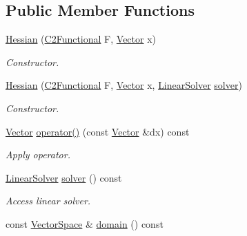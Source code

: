 \subsection*{Public Member Functions}
\begin{DoxyCompactItemize}
\item 
\hyperlink{classSpacy_1_1Hessian_a0d68a39d36030fb578c6082e66cd1733_a0d68a39d36030fb578c6082e66cd1733}{Hessian} (\hyperlink{group__SpacyGroup_gaf5b89e117806134b06a1ce4629fb2b65_gaf5b89e117806134b06a1ce4629fb2b65}{C2\+Functional} F, \hyperlink{classSpacy_1_1Vector}{Vector} x)
\begin{DoxyCompactList}\small\item\em Constructor. \end{DoxyCompactList}\item 
\hyperlink{classSpacy_1_1Hessian_a164c5994d90dbc86018e5763b20d406e_a164c5994d90dbc86018e5763b20d406e}{Hessian} (\hyperlink{group__SpacyGroup_gaf5b89e117806134b06a1ce4629fb2b65_gaf5b89e117806134b06a1ce4629fb2b65}{C2\+Functional} F, \hyperlink{classSpacy_1_1Vector}{Vector} x, \hyperlink{namespaceSpacy_a7d5cd1c6fb9dd85aa345b536caf30bba_a7d5cd1c6fb9dd85aa345b536caf30bba}{Linear\+Solver} \hyperlink{classSpacy_1_1Hessian_ab198b43edafe331ba98299e136dc6daa_ab198b43edafe331ba98299e136dc6daa}{solver})
\begin{DoxyCompactList}\small\item\em Constructor. \end{DoxyCompactList}\item 
\hyperlink{classSpacy_1_1Vector}{Vector} \hyperlink{classSpacy_1_1Hessian_a9ceba3446ef241ce4f557add097b8f9c_a9ceba3446ef241ce4f557add097b8f9c}{operator()} (const \hyperlink{classSpacy_1_1Vector}{Vector} \&dx) const 
\begin{DoxyCompactList}\small\item\em Apply operator. \end{DoxyCompactList}\item 
\hyperlink{namespaceSpacy_a7d5cd1c6fb9dd85aa345b536caf30bba_a7d5cd1c6fb9dd85aa345b536caf30bba}{Linear\+Solver} \hyperlink{classSpacy_1_1Hessian_ab198b43edafe331ba98299e136dc6daa_ab198b43edafe331ba98299e136dc6daa}{solver} () const 
\begin{DoxyCompactList}\small\item\em Access linear solver. \end{DoxyCompactList}\item 
const \hyperlink{classSpacy_1_1VectorSpace}{Vector\+Space} \& \hyperlink{classSpacy_1_1OperatorBase_a2588f9b3e0188820c4c494e63293dc6f_a2588f9b3e0188820c4c494e63293dc6f}{domain} () const 

\end{DoxyCompactItemize}
